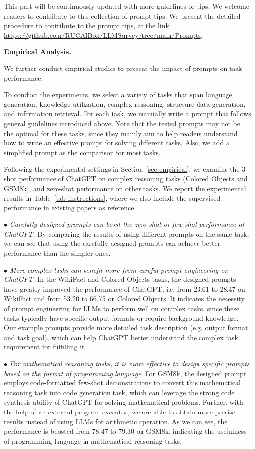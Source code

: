 {{{This part will be continuously updated with more guidelines or tips. We  welcome readers to contribute to this collection of  prompt tips. We present the detailed procedure to contribute to the prompt tips, at the link: \url{https://github.com/RUCAIBox/LLMSurvey/tree/main/Prompts}. 

\textbf{Empirical Analysis.}

We further conduct empirical studies to present the impact of prompts on task performance.

To conduct the experiments, we select a variety of tasks that span language generation, knowledge utilization, complex reasoning, structure data generation, and information retrieval. For each task, we manually write a prompt that follows general guidelines introduced above. Note that the tested prompts may not be the optimal for these tasks, since they mainly aim to help readers understand how to write an effective prompt for solving different tasks. Also, we add a simplified  prompt as the comparison for most tasks.  

Following the experimental settings in Section~\ref{sec-empirical}, we examine the  3-shot performance of ChatGPT on complex reasoning tasks (Colored Objects and GSM8k), and zero-shot performance on other tasks. We report the experimental results in Table~\ref{tab-instructions}, where we also include the supervised  performance in existing papers as reference. 

$\bullet$ \emph{Carefully designed prompts can boost the zero-shot or few-shot performance of ChatGPT.} By comparing the results of using different prompts on the same task, we can see that using the carefully designed prompts  can achieve better performance than the simpler ones. 

$\bullet$ {\emph{More complex tasks can benefit more from careful prompt engineering on ChatGPT.} In the WikiFact and Colored Objects tasks, the designed prompts have greatly improved the performance of ChatGPT, i.e. from 23.61 to 28.47 on WikiFact and from 53.20 to 66.75 on Colored Objects. It indicates the necessity of prompt engineering for LLMs to perform well on complex tasks, since these tasks typically have specific output formats or require background knowledge. Our example prompts  provide more detailed task description (e.g. output format and task goal),  which can help ChatGPT better understand the complex task requirement  for fulfilling it.}

$\bullet$  {\emph{For mathematical reasoning tasks, it is more effective to design specific prompts based on the format of programming language.} For GSM8k, the designed prompt employs code-formatted few-shot demonstrations to convert this mathematical reasoning task into code generation task, which can leverage the strong code synthesis ability of ChatGPT for solving mathematical problems. Further, with the help of an external program executor, we are able to obtain more precise results instead of using LLMs for arithmetic operation. As we can see, the performance is boosted from 78.47 to 79.30 on GSM8k, indicating the usefulness of programming language in mathematical reasoning tasks.} 

}}}
